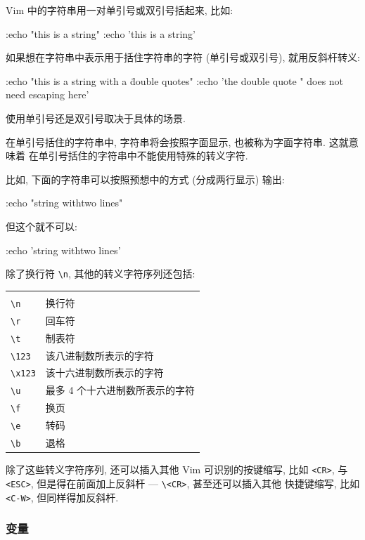Vim 中的字符串用一对单引号或双引号括起来, 比如:
\begin{vimcode}
:echo "this is a string"
:echo 'this is a string'
\end{vimcode}

如果想在字符串中表示用于括住字符串的字符 (单引号或双引号), 就用反斜杆转义:
\begin{vimcode}
:echo "this is a string with a \" double quotes"
:echo 'the double quote " does not need escaping here'
\end{vimcode}

使用单引号还是双引号取决于具体的场景.

在单引号括住的字符串中, 字符串将会按照字面显示, 也被称为字面字符串. 这就意味着
在单引号括住的字符串中不能使用特殊的转义字符.

比如, 下面的字符串可以按照预想中的方式 (分成两行显示) 输出:
\begin{vimcode}
:echo "string with\n two lines"
\end{vimcode}
但这个就不可以:
\begin{vimcode}
:echo 'string with\n two lines'
\end{vimcode}

除了换行符 \verb'\n', 其他的转义字符序列还包括:
\begin{tabular}{ll}
   \hline \\
   \verb'\n'    & 换行符 \\
   \verb'\r'    & 回车符 \\
   \verb'\t'    & 制表符 \\
   \verb'\123'  & 该八进制数所表示的字符 \\
   \verb'\x123' & 该十六进制数所表示的字符 \\
   \verb'\u'    & 最多 4 个十六进制数所表示的字符 \\
   \verb'\f'    & 换页 \\
   \verb'\e'    & 转码 \\
   \verb'\b'    & 退格 \\
   \hline
\end{tabular}

除了这些转义字符序列, 还可以插入其他 Vim 可识别的按键缩写, 比如 \texttt{<CR>},
与 \texttt{<ESC>}, 但是得在前面加上反斜杆 --- \verb'\<CR>', 甚至还可以插入其他
快捷键缩写, 比如 \texttt{<C-W>}, 但同样得加反斜杆.

\subsubsection{变量}
\label{subsubsec:variables}

